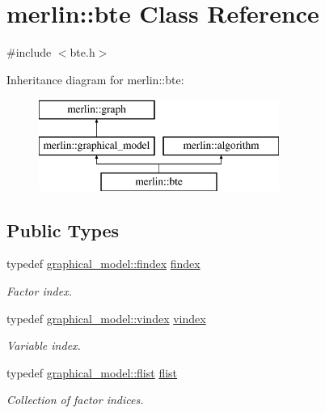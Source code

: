 \hypertarget{classmerlin_1_1bte}{}\section{merlin\+:\+:bte Class Reference}
\label{classmerlin_1_1bte}


{\ttfamily \#include $<$bte.\+h$>$}

Inheritance diagram for merlin\+:\+:bte\+:\begin{figure}[H]
\begin{center}
\leavevmode
\includegraphics[height=3.000000cm]{classmerlin_1_1bte}
\end{center}
\end{figure}
\subsection*{Public Types}
\begin{DoxyCompactItemize}
\item 
typedef \hyperlink{classmerlin_1_1graphical__model_ab2b46f09d8142bb68f243ecadbdabb6b}{graphical\+\_\+model\+::findex} \hyperlink{classmerlin_1_1bte_a9a8220f4a0d833a5b0044a05aecf21d3}{findex}\hypertarget{classmerlin_1_1bte_a9a8220f4a0d833a5b0044a05aecf21d3}{}\label{classmerlin_1_1bte_a9a8220f4a0d833a5b0044a05aecf21d3}

\begin{DoxyCompactList}\small\item\em Factor index. \end{DoxyCompactList}\item 
typedef \hyperlink{classmerlin_1_1graphical__model_a275006a490bc09239c12a4d93d53b135}{graphical\+\_\+model\+::vindex} \hyperlink{classmerlin_1_1bte_afd42180c7906586fb39a0384d096fa4a}{vindex}\hypertarget{classmerlin_1_1bte_afd42180c7906586fb39a0384d096fa4a}{}\label{classmerlin_1_1bte_afd42180c7906586fb39a0384d096fa4a}

\begin{DoxyCompactList}\small\item\em Variable index. \end{DoxyCompactList}\item 
typedef \hyperlink{classmerlin_1_1graphical__model_a615e25ec6594615fddfd4c3c4776b99f}{graphical\+\_\+model\+::flist} \hyperlink{classmerlin_1_1bte_a5152e6b6f4f04d615bf911fcfe92676f}{flist}\hypertarget{classmerlin_1_1bte_a5152e6b6f4f04d615bf911fcfe92676f}{}\label{classmerlin_1_1bte_a5152e6b6f4f04d615bf911fcfe92676f}

\begin{DoxyCompactList}\small\item\em Collection of factor indices. \end{DoxyCompactList}\end{DoxyCompactItemize}
